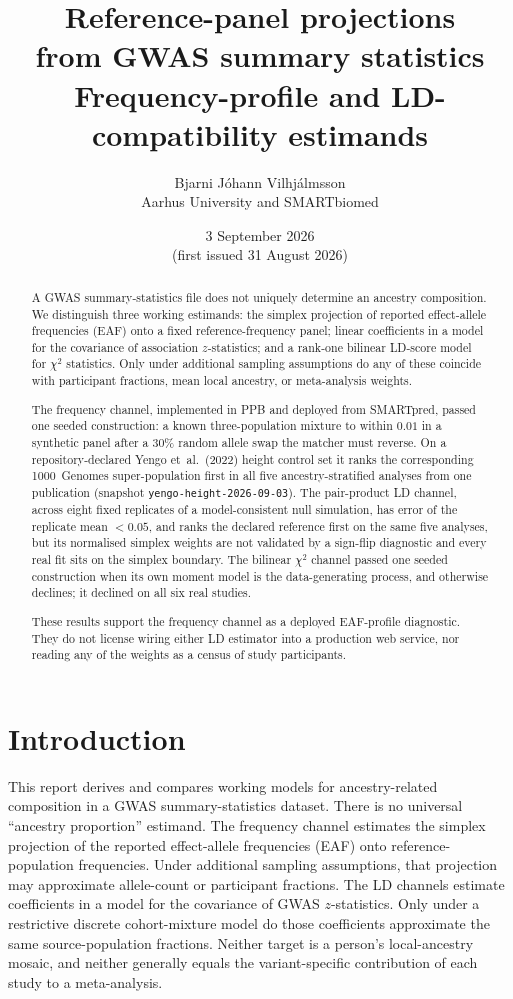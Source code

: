 \documentclass[11pt,a4paper]{article}
\title{%
  Reference-panel projections\\[0.15em]
  from GWAS summary statistics\\[0.45em]
  {\large Frequency-profile and LD-compatibility estimands}}
\author{Bjarni J\'ohann Vilhj\'almsson\\[0.35em]
  {\small Aarhus University and SMARTbiomed}}
\date{3 September 2026 \\[0.2em] {\small (first issued 31 August 2026)}}
\begin{document}
\maketitle
\thispagestyle{plain}

\begin{abstract}
\noindent
A GWAS summary-statistics file does not uniquely determine an ancestry
composition. We distinguish three working estimands: the simplex
projection of reported effect-allele frequencies (EAF) onto a fixed
reference-frequency panel; linear coefficients in a model for the
covariance of association $z$-statistics; and a rank-one bilinear
LD-score model for $\chi^2$ statistics. Only under additional sampling
assumptions do any of these coincide with participant fractions, mean
local ancestry, or meta-analysis weights.

The frequency channel, implemented in PPB and deployed from SMARTpred,
passed one seeded construction: a known three-population mixture to within
$0.01$ in a synthetic panel after a $30\%$ random allele swap the matcher
must reverse. On a repository-declared Yengo et~al.\ (2022) height control
set it ranks the corresponding 1000~Genomes super-population first in all
five ancestry-stratified analyses from one publication (snapshot
\texttt{yengo-height-2026-09-03}). The pair-product LD channel, across
eight fixed replicates of a model-consistent null simulation, has error
of the replicate mean $<0.05$, and ranks the declared reference first on
the same five analyses, but its normalised simplex weights are not
validated by a sign-flip diagnostic and every real fit sits on the simplex
boundary. The bilinear $\chi^2$ channel passed one seeded construction
when its own moment model is the data-generating process, and otherwise
declines; it declined on all six real studies.

These results support the frequency channel as a deployed EAF-profile
diagnostic. They do not license wiring either LD estimator into a
production web service, nor reading any of the weights as a census of
study participants.
\end{abstract}

\newpage
\tableofcontents
\newpage

\section{Introduction}\label{sec:summary}

This report derives and compares working models for ancestry-related
composition in a GWAS summary-statistics dataset. There is no universal
``ancestry proportion'' estimand. The frequency channel estimates the
simplex projection of the reported effect-allele frequencies (EAF) onto
reference-population frequencies. Under additional sampling assumptions,
that projection may approximate allele-count or participant fractions. The
LD channels estimate coefficients in a model for the covariance of GWAS
$z$-statistics. Only under a restrictive discrete cohort-mixture model do
those coefficients approximate the same source-population fractions.
Neither target is a person's local-ancestry mosaic, and neither generally
equals the variant-specific contribution of each study to a meta-analysis.
\end{document}
